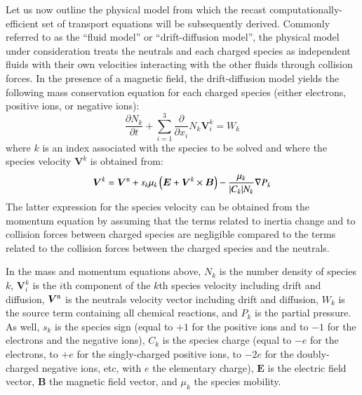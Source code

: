 \documentclass[twoside,onecolumn,10pt]{waflarticle}
\renewcommand{\vec}[1]{\bm{#1}}
\renewcommand{\vec}[1]{\bm{ #1 }}
\begin{document}
Let us now outline the physical model from which the recast computationally-efficient set of transport equations will be subsequently derived. Commonly referred to as the ``fluid model'' or ``drift-diffusion model'', the physical model under consideration treats the neutrals and each charged species as independent fluids with their own velocities interacting with the other fluids through collision forces. In the presence of a magnetic field, the drift-diffusion model yields the following mass conservation equation for each charged species (either electrons, positive ions, or negative ions):
%
\begin{equation}
  \frac{\partial N_k}{\partial t} + \sum_{i=1}^3 \frac{\partial}{\partial x_i} N_k \vec{V}_i^k = W_k
  \label{eqn:massconservation}
\end{equation}
%
where $k$ is an index associated with the species to be solved and where the species velocity $\vec{V}^k$ is obtained from:
%
\begin{equation}
  \vec{V}^k=\vec{V}^{\rm n} + s_k \mu_k \left(\vec{E}+\vec{V}^k \times \vec{B}\right)-\frac{\mu_k}{|C_k| N_k}\nabla P_k
 \label{eqn:Vvector}
\end{equation}
% 
The latter expression for the species velocity can be obtained from the momentum equation by assuming that the terms related to inertia change and to collision forces between charged species are negligible compared to the terms related to the collision forces between the charged species and the neutrals. 

In the mass and momentum equations above, $N_k$ is the number density of species $k$, $\vec{V}_i^k$ is the $i$th component of the $k$th species velocity including drift and diffusion, $\vec{V}^{\rm n}$ is the neutrals velocity vector including drift and diffusion, $W_k$ is the source term containing all chemical reactions, and $P_k$ is the partial pressure. As well, $s_k$ is the species sign  (equal to $+1$ for the positive ions and to $-1$ for the electrons and the negative ions), $C_k$ is the species charge  (equal to $-e$ for the electrons, to $+e$ for the singly-charged positive ions, to $-2e$ for the doubly-charged negative ions, etc, with $e$ the elementary charge), $\vec{E}$ is the electric field vector, $\vec{B}$ the magnetic field vector, and $\mu_k$ the species mobility.
 
\end{document}
